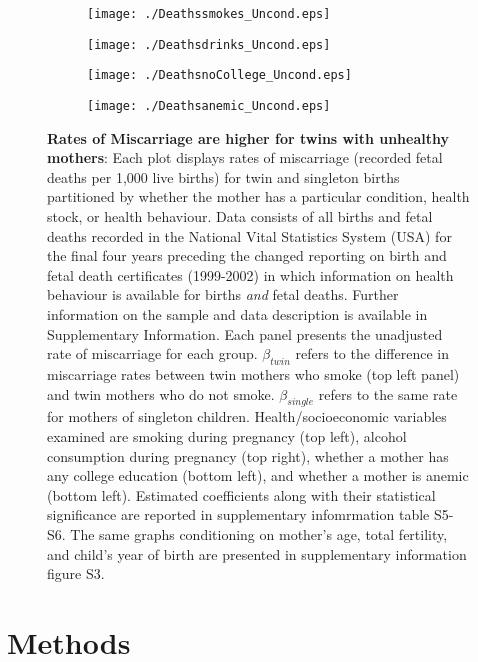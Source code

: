 \documentclass{nature}
\begin{document}
\begin{linenumbers}
\begin{spacing}{1}
\begin{figure}[htpb!]
\begin{subfigure}{.5\textwidth}
  \texttt{[image: ./Deathssmokes\_Uncond.eps]}
\end{subfigure}%
\begin{subfigure}{.5\textwidth}
  \texttt{[image: ./Deathsdrinks\_Uncond.eps]}
\end{subfigure}
\begin{subfigure}{.5\textwidth}
  \texttt{[image: ./DeathsnoCollege\_Uncond.eps]}
\end{subfigure}%
\begin{subfigure}{.5\textwidth}
  \texttt{[image: ./Deathsanemic\_Uncond.eps]}
\end{subfigure}
\vspace{5mm}
\caption{\textbf{Rates of Miscarriage are higher for twins with unhealthy mothers}: Each plot displays rates of miscarriage (recorded fetal deaths per 1,000 live births) for twin and singleton births partitioned by whether the mother has a particular condition, health stock, or health behaviour.  Data consists of all births and fetal deaths recorded in the National Vital Statistics System (USA) for the final four years preceding the changed reporting on birth and fetal death certificates (1999-2002) in which information on health behaviour is available for births \emph{and} fetal deaths.  Further information on the sample and data description is available in Supplementary Information.  Each panel presents the unadjusted rate of miscarriage for each group.  $\beta_{twin}$ refers to the difference in miscarriage rates between twin mothers who smoke (top left panel) and twin mothers who do not smoke. $\beta_{single}$ refers to the same rate for mothers of singleton children.  Health/socioeconomic variables examined are smoking during pregnancy (top left), alcohol consumption during pregnancy (top right), whether a mother has any college education (bottom left), and whether a mother is anemic (bottom left).  Estimated coefficients along with their statistical significance are reported in supplementary infomrmation table S5-S6.  The same graphs conditioning on mother's age, total fertility, and child's year of birth are presented in supplementary information figure S3.}
\label{fig:mech}
\end{figure}
\end{spacing}


\clearpage
\section{Methods}

\end{linenumbers}
\end{document}
